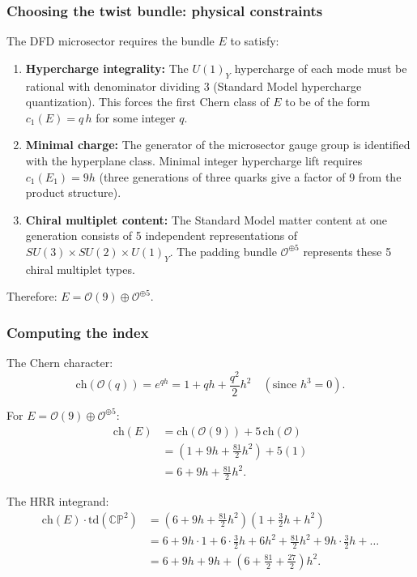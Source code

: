 \documentclass[11pt]{article}
\theoremstyle{definition}
\theoremstyle{remark}
\begin{document}
\subsubsection{Choosing the twist bundle: physical constraints}

The DFD microsector requires the bundle $E$ to satisfy:
\begin{enumerate}
\item \textbf{Hypercharge integrality:} The $U(1)_Y$ hypercharge of each
  mode must be rational with denominator dividing 3 (Standard Model
  hypercharge quantization). This forces the first Chern class of $E$
  to be of the form $c_1(E) = q\,h$ for some integer $q$.
\item \textbf{Minimal charge:} The generator of the microsector gauge group
  is identified with the hyperplane class. Minimal integer hypercharge lift
  requires $c_1(E_1) = 9h$ (three generations of three quarks give a factor
  of 9 from the product structure).
\item \textbf{Chiral multiplet content:} The Standard Model matter content
  at one generation consists of 5 independent representations of
  $SU(3)\times SU(2) \times U(1)_Y$. The padding bundle
  $\mathcal{O}^{\oplus 5}$ represents these 5 chiral multiplet types.
\end{enumerate}

Therefore: $E = \mathcal{O}(9) \oplus \mathcal{O}^{\oplus 5}$.

\subsubsection{Computing the index}

The Chern character:
\begin{equation}
\text{ch}(\mathcal{O}(q)) = e^{qh} = 1 + qh + \frac{q^2}{2}h^2
\quad (\text{since } h^3 = 0).
\end{equation}

For $E = \mathcal{O}(9) \oplus \mathcal{O}^{\oplus 5}$:
\begin{align}
\text{ch}(E) &= \text{ch}(\mathcal{O}(9)) + 5\,\text{ch}(\mathcal{O}) \nonumber\\
&= \left(1 + 9h + \frac{81}{2}h^2\right) + 5(1) \nonumber\\
&= 6 + 9h + \frac{81}{2}h^2.
\end{align}

The HRR integrand:
\begin{align}
\text{ch}(E)\cdot\text{td}(\mathbb{CP}^2) &=
\left(6 + 9h + \frac{81}{2}h^2\right)\left(1 + \frac{3}{2}h + h^2\right) \nonumber\\
&= 6 + 9h\cdot 1 + 6\cdot\frac{3}{2}h + 6h^2 + \frac{81}{2}h^2
+ 9h\cdot\frac{3}{2}h + \ldots \nonumber\\
&= 6 + 9h + 9h + \left(6 + \frac{81}{2} + \frac{27}{2}\right)h^2.
\end{align}
\end{document}
